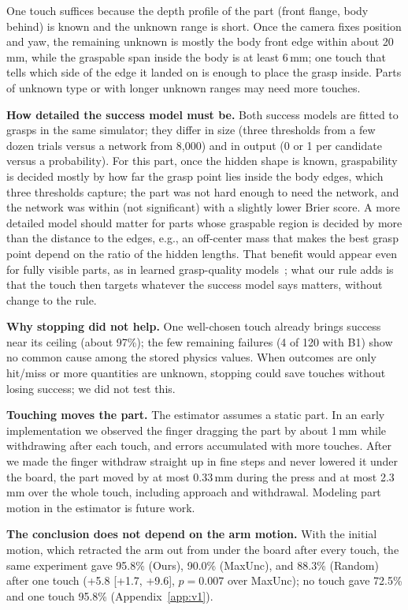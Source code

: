 \documentclass[conference]{IEEEtran}
\newcommand{\Ours}{Ours}
\newcommand{\Unc}{MaxUnc}
\newcommand{\Rand}{Random}
\begin{document}
One touch suffices because the depth profile of the part (front flange, body behind) is known and the unknown range is short. Once the camera fixes position and yaw, the remaining unknown is mostly the body front edge within about 20\,mm, while the graspable span inside the body is at least 6\,mm; one touch that tells which side of the edge it landed on is enough to place the grasp inside. Parts of unknown type or with longer unknown ranges may need more touches.

\textbf{How detailed the success model must be.} Both success models are fitted to grasps in the same simulator; they differ in size (three thresholds from a few dozen trials versus a network from 8,000) and in output (0 or 1 per candidate versus a probability). For this part, once the hidden shape is known, graspability is decided mostly by how far the grasp point lies inside the body edges, which three thresholds capture; the part was not hard enough to need the network, and the network was within \GeomDiffShort{} (not significant) with a slightly lower Brier score. A more detailed model should matter for parts whose graspable region is decided by more than the distance to the edges, e.g., an off-center mass that makes the best grasp point depend on the ratio of the hidden lengths. That benefit would appear even for fully visible parts, as in learned grasp-quality models~\cite{mahler2017dexnet2}; what our rule adds is that the touch then targets whatever the success model says matters, without change to the rule.

\textbf{Why stopping did not help.} One well-chosen touch already brings success near its ceiling (about 97\%); the few remaining failures (4 of 120 with B1) show no common cause among the stored physics values. When outcomes are only hit/miss or more quantities are unknown, stopping could save touches without losing success; we did not test this.

\textbf{Touching moves the part.} The estimator assumes a static part. In an early implementation we observed the finger dragging the part by about 1\,mm while withdrawing after each touch, and errors accumulated with more touches. After we made the finger withdraw straight up in fine steps and never lowered it under the board, the part moved by at most 0.33\,mm during the press and at most 2.3\,mm over the whole touch, including approach and withdrawal. Modeling part motion in the estimator is future work.

\textbf{The conclusion does not depend on the arm motion.} With the initial motion, which retracted the arm out from under the board after every touch, the same experiment gave 95.8\% (\Ours), 90.0\% (\Unc), and 88.3\% (\Rand) after one touch (+5.8 [+1.7, +9.6], $p=0.007$ over \Unc); no touch gave 72.5\% and one touch 95.8\% (Appendix~\ref{app:v1}).
\end{document}
